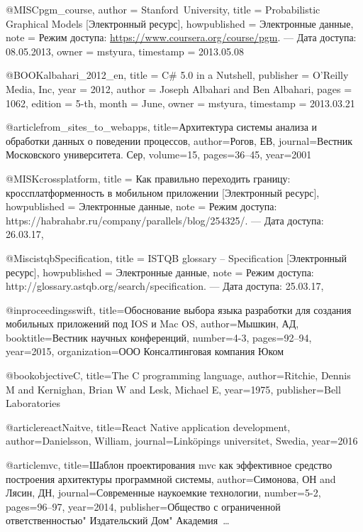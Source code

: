 
@MISC{pgm_course,
  author = {\mbox{Stanford University}},
  title = {Probabilistic Graphical Models [Электронный ресурс]},
  howpublished = {Электронные данные},
  note = {Режим доступа: \url{https://www.coursera.org/course/pgm}. --- Дата
	доступа: 08.05.2013},
  owner = {mstyura},
  timestamp = {2013.05.08}
}

@BOOK{albahari_2012_en,
  title = {C\# 5.0 in a Nutshell},
  publisher = {O’Reilly Media, Inc},
  year = {2012},
  author = {Joseph Albahari and Ben Albahari},
  pages = {1062},
  edition = {5-th},
  month = {June},
  owner = {mstyura},
  timestamp = {2013.03.21}
}

@article{from_sites_to_webapps,
  title={Архитектура системы анализа и обработки данных о поведении процессов},
  author={Рогов, ЕВ},
  journal={Вестник Московского университета. Сер},
  volume={15},
  pages={36--45},
  year={2001}
}

@MISK{crossplatform,
  title        = {Как правильно переходить границу: кроссплатформенность в мобильном приложении [Электронный ресурс]},
  howpublished = {Электронные данные},
  note         = {Режим доступа: https://habrahabr.ru/company/parallels/blog/254325/. --- Дата доступа: 26.03.17},
}

@Misc{istqbSpecification,
  title        = {ISTQB glossary -- Specification [Электронный ресурс]},
  howpublished = {Электронные данные},
  note         = {Режим доступа: http://glossary.astqb.org/search/specification. --- Дата доступа: 25.03.17},
}

@inproceedings{swift,
  title={Обоснование выбора языка разработки для создания мобильных приложений под IOS и Mac OS},
  author={Мышкин, АД},
  booktitle={Вестник научных конференций},
  number={4-3},
  pages={92--94},
  year={2015},
  organization={ООО Консалтинговая компания Юком}
}

@book{objectiveC,
  title={The C programming language},
  author={Ritchie, Dennis M and Kernighan, Brian W and Lesk, Michael E},
  year={1975},
  publisher={Bell Laboratories}
}

@article{reactNaitve,
  title={React Native application development},
  author={Danielsson, William},
  journal={Link{\"o}pings universitet, Swedia},
  year={2016}
}

@article{mvc,
  title={Шаблон проектирования mvc как эффективное средство построения архитектуры программной системы},
  author={Симонова, ОН and Лясин, ДН},
  journal={Современные наукоемкие технологии},
  number={5-2},
  pages={96--97},
  year={2014},
  publisher={Общество с ограниченной ответственностью" Издательский Дом" Академия~…}
}

